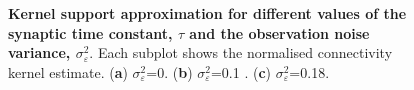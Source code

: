 \documentclass[]{article}
\begin{document}
\begin{figure}[!ht]
\begin{center}
\end{center}
\caption{{\bf Kernel support approximation for different values of the synaptic time constant, $\tau$ and the observation noise variance, $\sigma^2_{\varepsilon}$}. Each subplot shows the normalised connectivity kernel estimate. (\textbf a) $\sigma_{\varepsilon}^2$=0. (\textbf b) $\sigma_{\varepsilon}^2$=0.1 . (\textbf c) $\sigma_{\varepsilon}^2$=0.18.}
\label{fig:KernelWidthEstimationExperiment}
\end{figure}
\end{document}
